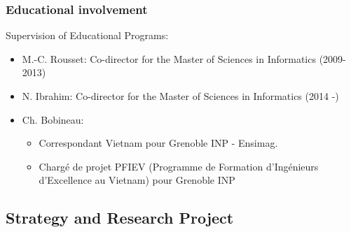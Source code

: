 \subsubsection*{Educational involvement} %

Supervision of Educational Programs:
\begin{itemize}

\item M.-C. Rousset: Co-director for the Master of Sciences in Informatics (2009-2013)

\item N. Ibrahim: Co-director for the Master of Sciences in Informatics (2014 -) 

\item Ch. Bobineau: 
\begin{itemize}
\setlength{\itemsep}{-0.4cm}
\item Correspondant Vietnam pour Grenoble INP - Ensimag. \\
\item Charg{\'e} de projet PFIEV (Programme de Formation d'Ing\'enieurs d'Excellence au Vietnam) pour Grenoble INP
\end{itemize}
\end {itemize}

\subsection{Strategy and Research Project} %
\label{sub:hadas_strategy_and_research_project}


